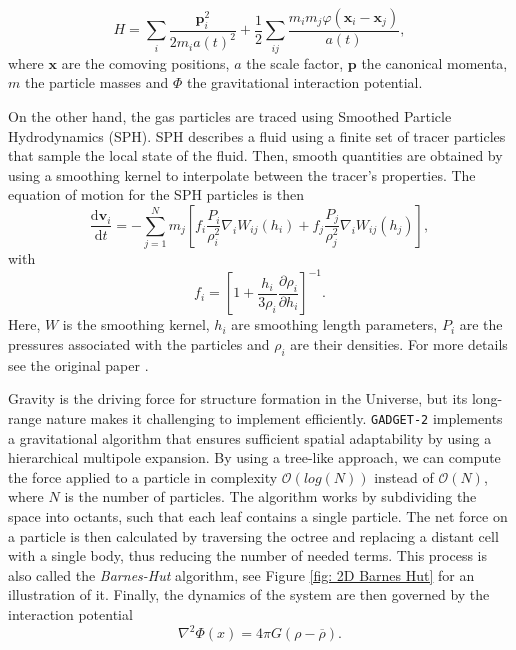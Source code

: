 \begin{equation}
        H=\sum_i\frac{\boldsymbol{p}_i^2}{2 m_i a(t)^2}+\frac12\sum_{ij}\frac{m_im_j \varphi(\boldsymbol{x}_i-\boldsymbol{x}_j)}{a(t)},
\end{equation}
where $\boldsymbol{x}$ are the comoving positions, $a$ the scale factor, $\boldsymbol{p}$ the canonical momenta, $m$ the particle masses and $\varPhi$ the gravitational interaction potential.

On the other hand, the gas particles are traced using Smoothed Particle Hydrodynamics (SPH). SPH describes a fluid using a finite set of tracer particles that sample the local state of the fluid. Then, smooth quantities are obtained by using a smoothing kernel to interpolate between the tracer's properties. The equation of motion for the SPH particles is then
\begin{equation}
        \frac{\mathrm{d}\boldsymbol{v}_i}{\mathrm{d}t}=-\sum_{j=1}^Nm_j\left[f_i\frac{P_i}{\rho_i^2}\nabla_iW_{ij}(h_i)+f_j\frac{P_j}{\rho_j^2}\nabla_iW_{ij}(h_j)\right],
\end{equation}
with
\begin{equation}
        f_i=\left[1+\frac{h_i}{3\rho_i}\frac{\partial\rho_i}{\partial h_i}\right]^{-1}.
\end{equation}
Here, $W$ is the smoothing kernel, $h_i$ are smoothing length parameters, $P_i$ are the pressures associated with the particles and $\rho_i$ are their densities. For more details see the original paper \cite{Springel_2005}.



Gravity is the driving force for structure formation in the Universe, but its long-range nature makes it challenging to implement efficiently. \texttt{GADGET-2} implements a gravitational algorithm that ensures sufficient spatial adaptability by using a hierarchical multipole expansion. By using a tree-like approach, we can compute the force applied to a particle in complexity $\mathcal{O}(log(N))$ instead of $\mathcal{O}(N)$, where $N$ is the number of particles. The algorithm works by subdividing the space into octants, such that each leaf contains a single particle. The net force on a particle is then calculated by traversing the octree and replacing a distant cell with a single body, thus reducing the number of needed terms. This process is also called the \emph{Barnes-Hut} algorithm, see Figure \ref{fig: 2D Barnes Hut} for an illustration of it. Finally, the  dynamics of the system are then governed by the interaction potential
\begin{equation}
        \nabla^2\varPhi(x)=4\pi G(\rho-\overline{\rho}).
\end{equation}

